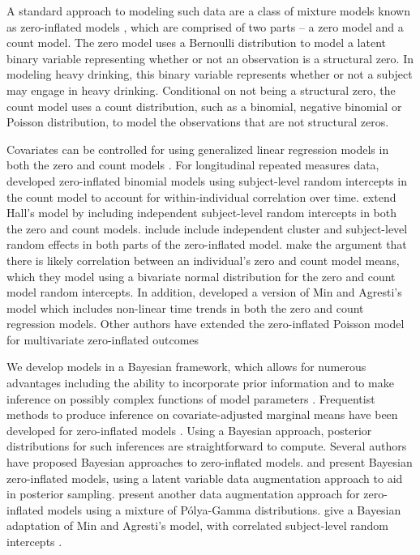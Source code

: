 \documentclass[12pt]{article}
\begin{document}
A standard approach to modeling such data are a class of mixture models known as zero-inflated models \citep{cohen1966note, johnson2005univariate, ridout1998models}, which are comprised of two parts -- a zero model and a count model. The zero model uses a Bernoulli distribution to model a latent binary variable representing whether or not an observation is a structural zero. In modeling heavy drinking, this binary variable represents whether or not a subject may engage in heavy drinking. Conditional on not being a structural zero, the count model uses a count distribution, such as a binomial, negative binomial or Poisson distribution, to model the observations that are not structural zeros. 

Covariates can be controlled for using generalized linear regression models in both the zero and count models \citep{mullahy1986specification, lambert1992zero, heilbron1994zero}. For longitudinal repeated measures data, \cite{hall2000zero} developed zero-inflated binomial models using subject-level random intercepts in the count model to account for within-individual correlation over time. \cite{yau2001zero} extend Hall's model by including independent subject-level random intercepts in both the zero and count models. \cite{lee2006multi} include include independent cluster and subject-level random effects in both parts of the zero-inflated model. \cite{min2005random} make the argument that there is likely correlation between an individual's zero and count model means, which they model using a bivariate normal distribution for the zero and count model random intercepts. In addition, \cite{buu2012statistical} developed a version of Min and Agresti's model which includes non-linear time trends in both the zero and count regression models. Other authors have extended the zero-inflated Poisson model for multivariate zero-inflated outcomes \cite{wu2023multivariate, liu2015type}

We develop models in a Bayesian framework, which allows for numerous advantages including the ability to incorporate prior information and to make inference on possibly complex functions of model parameters \citep{gelman2013bayesian}. Frequentist methods to produce inference on covariate-adjusted marginal means have been developed for zero-inflated models \citep{albert2014estimating, preisser2016marginalized}. Using a Bayesian approach, posterior distributions for such inferences are straightforward to compute. Several authors have proposed Bayesian approaches to zero-inflated models.  \cite{rodrigues2003bayesian} and \cite{ghosh2006bayesian} present Bayesian zero-inflated models, using a latent variable data augmentation approach to aid in posterior sampling. \cite{wen2024bayesian} present another data augmentation approach for zero-inflated models using a mixture of P\'{o}lya-Gamma distributions. \cite{neelon2010bayesian} give a Bayesian adaptation of Min and Agresti's model, with correlated subject-level random intercepts \citep{spiegelhalter1998bayesian, cooper2007predicting}.
\end{document}
